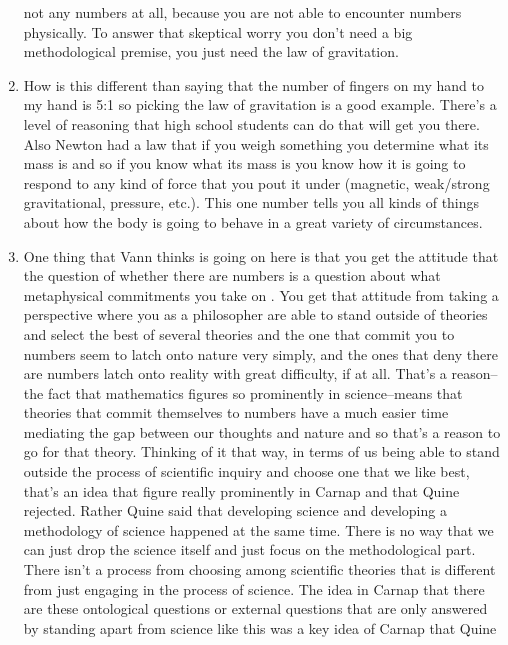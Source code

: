 \documentclass[12pt]{article}
\theoremstyle{definition}
\begin{document}
\begin{enumerate}
        not any numbers at all, because you are not able to encounter numbers
        physically. To answer that skeptical worry you don't need a big
        methodological premise, you just need the law of gravitation.
    \item
        How is this different than saying that the number of fingers on my hand
        to my hand is 5:1 so picking the law of gravitation is a good example.
        There's a level of reasoning that high school students can do that will
        get you there. Also Newton had a law that if you weigh something you
        determine what its mass is and so if you know what its mass is you know
        how it is going to respond to any kind of force that you pout it under
        (magnetic, weak/strong gravitational, pressure, etc.). This one number
        tells you all kinds of things about how the body is going to behave in
        a great variety of circumstances.
    \item
        One thing that Vann thinks is going on here is that you get the
        attitude that the question of whether there are numbers is a question
        about what metaphysical commitments you take on . You get that attitude
        from taking a perspective where you as a philosopher are able to stand
        outside of theories and select the best of several theories and the one
        that commit you to numbers seem to latch onto nature very simply, and
        the ones that deny there are numbers latch onto reality with great
        difficulty, if at all. That's a reason--the fact that mathematics
        figures so prominently in science--means that theories that commit
        themselves to numbers have a much easier time mediating the gap between
        our thoughts and nature and so that's a reason to go for that theory.
        Thinking of it that way, in terms of us being able to stand outside the
        process of scientific inquiry and choose one that we like best, that's
        an idea that figure really prominently in Carnap and that Quine
        rejected. Rather Quine said that developing science and developing a
        methodology of science happened at the same time. There is no way that
        we can just drop the science itself and just focus on the
        methodological part. There isn't a process from choosing among
        scientific theories that is different from just engaging in the process
        of science. The idea in Carnap that there are these ontological
        questions or external questions that are only answered by standing
        apart from science like this was a key idea of Carnap that Quine

\end{enumerate}
\end{document}
